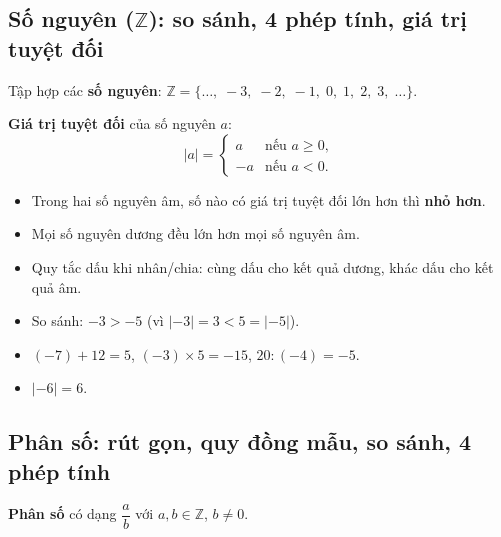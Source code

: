 \documentclass[12pt,a4paper]{article}
\begin{document}
\subsection{Số nguyên ($\mathbb{Z}$): so sánh, 4 phép tính, giá trị tuyệt đối}

\begin{dinhnghia}
Tập hợp các \textbf{số nguyên}: $\mathbb{Z} = \{\ldots,\; -3,\; -2,\; -1,\; 0,\; 1,\; 2,\; 3,\; \ldots\}$.

\textbf{Giá trị tuyệt đối} của số nguyên $a$:
\[
|a| = \begin{cases} a & \text{nếu } a \ge 0, \\ -a & \text{nếu } a < 0. \end{cases}
\]
\end{dinhnghia}

\begin{tinhchat}
\begin{itemize}
  \item Trong hai số nguyên âm, số nào có giá trị tuyệt đối lớn hơn thì \textbf{nhỏ hơn}.
  \item Mọi số nguyên dương đều lớn hơn mọi số nguyên âm.
  \item Quy tắc dấu khi nhân/chia: cùng dấu cho kết quả dương, khác dấu cho kết quả âm.
\end{itemize}
\end{tinhchat}

\begin{vidu}
\begin{itemize}
  \item So sánh: $-3 > -5$ \quad (vì $|-3| = 3 < 5 = |-5|$).
  \item $(-7) + 12 = 5$, \quad $(-3) \times 5 = -15$, \quad $20 : (-4) = -5$.
  \item $|-6| = 6$.
\end{itemize}
\end{vidu}

\subsection{Phân số: rút gọn, quy đồng mẫu, so sánh, 4 phép tính}

\begin{dinhnghia}
\textbf{Phân số} có dạng $\dfrac{a}{b}$ với $a, b \in \mathbb{Z}$, $b \ne 0$.
\end{dinhnghia}
\end{document}
